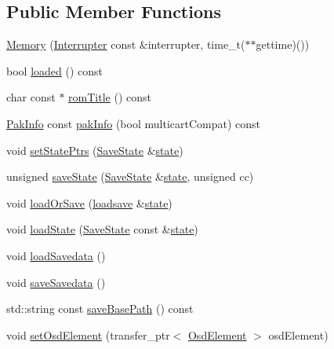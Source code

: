 \subsection*{Public Member Functions}
\begin{DoxyCompactItemize}
\item 
\hyperlink{classgambatte_1_1Memory_a9945124a92611e7868bbd52418a3e40c}{Memory} (\hyperlink{classgambatte_1_1Interrupter}{Interrupter} const \&interrupter, time\+\_\+t($\ast$$\ast$gettime)())
\item 
bool \hyperlink{classgambatte_1_1Memory_ac408f41b5da4d1dcf78b13bf4658f9e8}{loaded} () const
\item 
char const  $\ast$ \hyperlink{classgambatte_1_1Memory_a6a1305328c8499d094f17339871d560c}{rom\+Title} () const
\item 
\hyperlink{classgambatte_1_1PakInfo}{Pak\+Info} const \hyperlink{classgambatte_1_1Memory_a0777592e6bd7ae61aa89d6d4335d6970}{pak\+Info} (bool multicart\+Compat) const
\item 
void \hyperlink{classgambatte_1_1Memory_a1e277e1f1b72165fb334139471fc8418}{set\+State\+Ptrs} (\hyperlink{structgambatte_1_1SaveState}{Save\+State} \&\hyperlink{ppu_8cpp_a2f2eca6997ee7baf8901725ae074d45b}{state})
\item 
unsigned \hyperlink{classgambatte_1_1Memory_a1dc38f529eb812d8720ea02d0f4ae6fe}{save\+State} (\hyperlink{structgambatte_1_1SaveState}{Save\+State} \&\hyperlink{ppu_8cpp_a2f2eca6997ee7baf8901725ae074d45b}{state}, unsigned cc)
\item 
void \hyperlink{classgambatte_1_1Memory_a40b7846d15c6e94c925e996ee49d23e7}{load\+Or\+Save} (\hyperlink{classgambatte_1_1loadsave}{loadsave} \&\hyperlink{ppu_8cpp_a2f2eca6997ee7baf8901725ae074d45b}{state})
\item 
void \hyperlink{classgambatte_1_1Memory_acbee7abfbfc1db12aac70effcee425e5}{load\+State} (\hyperlink{structgambatte_1_1SaveState}{Save\+State} const \&\hyperlink{ppu_8cpp_a2f2eca6997ee7baf8901725ae074d45b}{state})
\item 
void \hyperlink{classgambatte_1_1Memory_a48044eb49376c2cd2a71eaacef835c24}{load\+Savedata} ()
\item 
void \hyperlink{classgambatte_1_1Memory_a1712a9407525b2de710b055106b5770c}{save\+Savedata} ()
\item 
std\+::string const \hyperlink{classgambatte_1_1Memory_a83a8f1281b2dd704eaffb7dc6222948d}{save\+Base\+Path} () const
\item 
void \hyperlink{classgambatte_1_1Memory_a86d9fc1ad5d5b350dd32605f81fb4a4a}{set\+Osd\+Element} (transfer\+\_\+ptr$<$ \hyperlink{classgambatte_1_1OsdElement}{Osd\+Element} $>$ osd\+Element)
$$
\end{DoxyCompactItemize}
